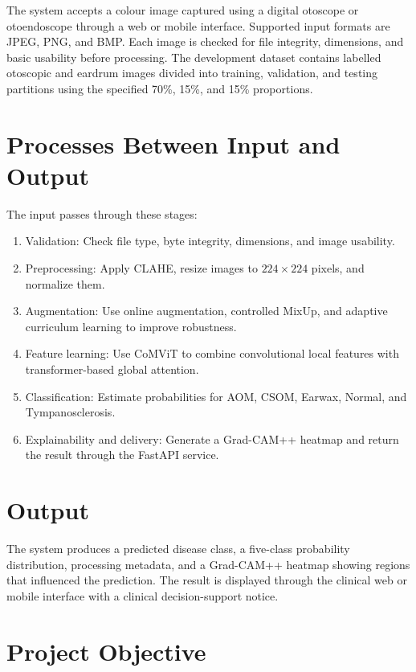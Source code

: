 \documentclass[12pt,a4paper]{report}
\renewcommand{\textbf}[1]{#1}
\begin{document}
The system accepts a colour image captured using a digital otoscope or otoendoscope through a web or mobile interface. Supported input formats are JPEG, PNG, and BMP. Each image is checked for file integrity, dimensions, and basic usability before processing. The development dataset contains labelled otoscopic and eardrum images divided into training, validation, and testing partitions using the specified 70\%, 15\%, and 15\% proportions.

\section{Processes Between Input and Output}

The input passes through these stages:
\begin{enumerate}
    \item \textbf{Validation:} Check file type, byte integrity, dimensions, and image usability.
    \item \textbf{Preprocessing:} Apply CLAHE, resize images to $224 \times 224$ pixels, and normalize them.
    \item \textbf{Augmentation:} Use online augmentation, controlled MixUp, and adaptive curriculum learning to improve robustness.
    \item \textbf{Feature learning:} Use CoMViT to combine convolutional local features with transformer-based global attention.
    \item \textbf{Classification:} Estimate probabilities for AOM, CSOM, Earwax, Normal, and Tympanosclerosis.
    \item \textbf{Explainability and delivery:} Generate a Grad-CAM++ heatmap and return the result through the FastAPI service.
\end{enumerate}

\section{Output}

The system produces a predicted disease class, a five-class probability distribution, processing metadata, and a Grad-CAM++ heatmap showing regions that influenced the prediction. The result is displayed through the clinical web or mobile interface with a clinical decision-support notice.

\section{Project Objective}
\end{document}
